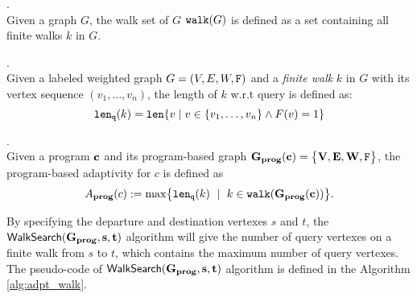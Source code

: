 \documentclass[a4paper,11pt]{article}
\begin{document}
\begin{defn}.
\\
Given a graph $G$, the walk set of $G$ $\mathtt{walk}(G)$ is defined as a set containing all finite walks $k$ in $G$.
\end{defn}
%
%
\begin{defn}.
\\
Given a labeled weighted graph $G=(V,E,W,\mathtt{F} )$ and a \emph{finite walk} $k$ in $G$ with its vertex sequence $(v_1, \ldots, v_{n})$, the length of $k$ w.r.t query is defined as:
\[
	\mathtt{len}_{\tt q}(k) = \mathtt{len}\{ v \mid v \in \{v_1, \ldots, v_{n}\} \land F(v) = 1 \}
\]
\end{defn}


\begin{defn}
.
\label{def:prog_adapt}
\\
{
Given a program $\mathbf{{c}}$ and its program-based graph 
$\bf{G_{prog}}(\mathbf{{c}}) = \big\{ V, E, W, \mathtt{F} \big\}$,
%
the program-based adaptivity for $c$ is defined as%
\[
A_{\bf{prog}}(c) 
:= \max
\left\{ \len_{\tt q}(k)\ \mid \  k\in {\tt walk}(\progG(\ssa{c}))\right \}.
\]
}
%
\end{defn}  
%
By specifying the departure and destination vertexes $s$ and $t$, the $\mathsf{WalkSearch}(\bf{G_{prog}}, s, t)$ algorithm will 
give the number of query vertexes on a finite walk from $s$ to $t$, which contains the maximum number of query vertexes.
The pseudo-code of $\mathsf{WalkSearch}(\bf{G_{prog}}, s, t)$ algorithm is defined in the Algorithm \ref{alg:adpt_walk}.
%
\end{document}
